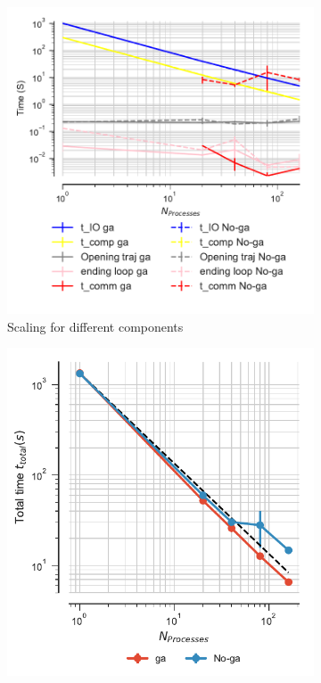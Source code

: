  \begin{figure}[ht!]
\centering
\begin{subfigure}{.3\textwidth}
  \includegraphics[width=\linewidth]{figures/Comparison_IO_compute_scaling_traj_splitting-SuperMIC.pdf}
  \caption{Scaling for different components}
  \label{fig:MPIscaling-chain-reader}
\end{subfigure}
\hfill
\begin{subfigure}{.3\textwidth}
  \includegraphics[width=\linewidth]{figures/Comparison_tot_time_traj_splitting-SuperMIC.pdf}

\end{subfigure}
\end{figure}
